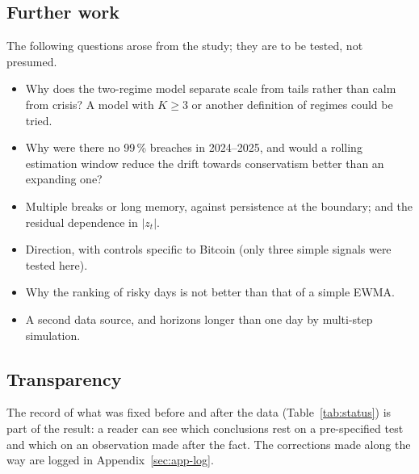 \documentclass[12pt,a4paper]{article}
\begin{document}
\subsection{Further work}

The following questions arose from the study; they are to be tested, not presumed.
\begin{itemize}
	\item Why does the two-regime model separate scale from tails rather than calm from crisis? A model with $K\ge3$ or another definition of regimes could be tried.
	\item Why were there no 99\,\% breaches in 2024--2025, and would a rolling estimation window reduce the drift towards conservatism better than an expanding one?
	\item Multiple breaks or long memory, against persistence at the boundary; and the residual dependence in $|z_t|$.
	\item Direction, with controls specific to Bitcoin (only three simple signals were tested here).
	\item Why the ranking of risky days is not better than that of a simple EWMA.
	\item A second data source, and horizons longer than one day by multi-step simulation.
\end{itemize}

\subsection{Transparency}

The record of what was fixed before and after the data (Table~\ref{tab:status}) is part of the result: a reader can see which conclusions rest on a pre-specified test and which on an observation made after the fact. The corrections made along the way are logged in Appendix~\ref{sec:app-log}.
\end{document}
